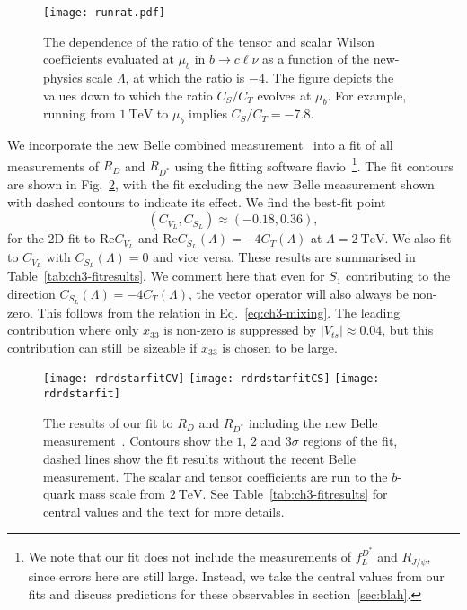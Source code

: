 \begin{figure}[t]
  \centering%
\centering \texttt{[image: runrat.pdf]}
\caption[The dependence of the ratio of the tensor and scalar Wilson
coefficients evaluated at $\mu_b$ in $b \to c \ell \nu$ as a function of the
new-physics scale $\Lambda$, at which the ratio is $-4$.]{The dependence of the
  ratio of the tensor and scalar Wilson coefficients evaluated at $\mu_b$ in
  $b \to c \ell \nu$ as a function of the new-physics scale $\Lambda$, at which
  the ratio is $-4$. The figure depicts the values down to which the ratio
  $C_S/C_T$ evolves at $\mu_b$. For example, running from $\SI{1}{\TeV}$ to
  $\mu_b$ implies $C_S/C_T= -7.8$.}
\label{fig:ch3-runrat}
\end{figure}

We incorporate the new Belle combined measurement~\cite{Abdesselam:2019dgh} into
a fit of all measurements of $R_{D}$ and $R_{D^*}$ using the fitting software
\textsf{flavio}~\cite{Straub:2018kue}\footnote{We note that our fit does not
  include the measurements of $f_L^{D^*}$ and $R_{J/\psi}$, since errors here
  are still large. Instead, we take the central values from our fits and discuss
  predictions for these observables in section~\ref{sec:blah}.}. The fit
contours are shown in Fig.~\ref{fig:ch3-fit}, with the fit excluding the new Belle
measurement shown with dashed contours to indicate its effect. We find the
best-fit point
\begin{equation}
({C}_{V_L}, {C}_{S_L}) \approx (-0.18, 0.36),
\end{equation}
for the 2D fit to $\text{Re} C_{V_L}$ and
$\text{Re} C_{S_L} (\Lambda) = -4 C_T(\Lambda)$ at $\Lambda = \SI{2}{\TeV}$. We
also fit to $C_{V_L}$ with $C_{S_L}(\Lambda)=0$ and vice versa. These results
are summarised in Table~\ref{tab:ch3-fitresults}. We comment here that even for
$S_{1}$ contributing to the direction $C_{S_L}(\Lambda) = - 4 C_T(\Lambda)$, the
vector operator will also always be non-zero. This follows from the relation in
Eq.~\eqref{eq:ch3-mixing}. The leading contribution where only $x_{33}$ is
non-zero is suppressed by $|V_{ts}| \approx 0.04$, but this contribution can
still be sizeable if $x_{33}$ is chosen to be large.

\begin{figure}
    \centering
    \texttt{[image: rdrdstarfitCV]}
    \texttt{[image: rdrdstarfitCS]}
    \texttt{[image: rdrdstarfit]}
    \caption{The results of our fit to $R_D$ and $R_{D^*}$ including the new
      Belle measurement~\cite{Abdesselam:2019dgh}. Contours show the $1$, $2$
      and $3\sigma$ regions of the fit, dashed lines show the fit results
      without the recent Belle measurement. The scalar and tensor coefficients
      are run to the $b$-quark mass scale from $\SI{2}{\TeV}$. See
      Table~\ref{tab:ch3-fitresults} for central values and the text for more
      details.}
    \label{fig:ch3-fit}
\end{figure}


